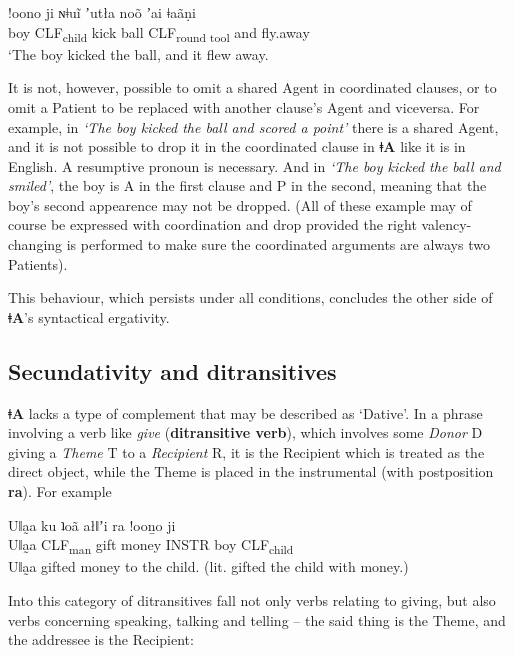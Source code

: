 \documentclass[11pt,a5paper]{book}
\newcommand{\qcn}[1]{\textcolor{AccentText}{\large\textbf{#1}}}
\newcommand{\langname}{\qcn{ǂA}}
\newcommand{\grammsc}[1]{\textsc{#1}}
\newcommand{\CLF}[1]{\grammsc{CLF}\textsubscript{#1}}
\begin{document}
\begin{exe}
\ex
\gll !oono 	ji 	ɴǂuĩ 	 	ʼutła 	noõ  ʼai ǂaãṇi \\
boy 	\CLF{child} 	kick 	ball 	\CLF{round tool}   and	fly.away  \\
\glt `The boy kicked the ball, and it flew away.
\end{exe}

It is not, however, possible to omit a shared Agent in coordinated clauses, or to omit a Patient to be replaced with another clause's Agent and viceversa. For example, in \emph{`The boy kicked the ball and scored a point'} there is a shared Agent, and it is not possible to drop it in the coordinated clause in \langname{} like it is in English. A resumptive pronoun is necessary. And in \emph{`The boy kicked the ball and smiled'}, the boy is A in the first clause and P in the second, meaning that the boy's second appearence may not be dropped. (All of these example may of course be expressed with coordination and drop provided the right valency-changing is performed to make sure the coordinated arguments are always two Patients).

This behaviour, which persists under all conditions, concludes the other side of \langname's syntactical ergativity.

\subsection{Secundativity and ditransitives}

\langname{} lacks a type of complement that may be described as `Dative'. In a phrase involving a verb like \emph{give} (\textbf{ditransitive verb}), which involves some \emph{Donor} D giving a \emph{Theme} T to a \emph{Recipient} R, it is the Recipient which is treated as the direct object, while the Theme is placed in the instrumental (with postposition \qcn{ra}). For example

\begin{exe}
\ex
\gll Uǁa̰a ku ʇoã ałǁʼi ra  !ooṉo 	ji\\
Uǁa̰a \CLF{man} gift money INSTR boy \CLF{child}\\
\glt Uǁa̰a gifted money to the child. (lit. gifted the child with money.)
\end{exe}

Into this category of ditransitives fall not only verbs relating to giving, but also verbs concerning speaking, talking and telling -- the said thing is the Theme, and the addressee is the Recipient:
\end{document}
